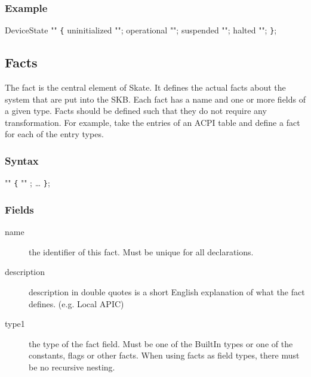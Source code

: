 \documentclass[a4paper,11pt,twoside]{report}
\begin{document}
{{\subsubsection{Example}
\begin{syntax}
 DeviceState "" \verb+{+
    uninitialized "";
    operational   "";
    suspended     "";
    halted        "";
\verb+}+;
\end{syntax}

\subsection{Facts}
\label{sec:decl:facts}

The fact is the central element of Skate. It defines the actual facts about the
system that are put into the SKB. Each fact has a name and one or more fields
of a given type. Facts should be defined such that they do not require any 
transformation. For example, take the entries of an ACPI table and define a
fact for each of the entry types. 

\subsubsection{Syntax}

\begin{syntax}
   "" \verb+{+
      "" ;
    \ldots
\verb+}+;
\end{syntax}

\subsubsection{Fields}

\begin{description}
    \item[name] the identifier of this fact. Must be unique for all 
                declarations.
    
    \item[description] description in double quotes is a short English          
                       explanation of what the fact defines. (e.g. Local APIC)
    
    \item[type1] the type of the fact field. Must be one of the BuiltIn types
                 or one of the constants, flags or other facts. When using 
                 facts as field types, there must be no recursive nesting.


\end{description}}}
\end{document}
